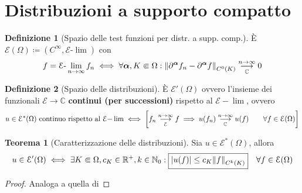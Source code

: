 \documentclass[a4paper,10pt]{article}
\theoremstyle{definition}
\newcommand{\bv}{\boldsymbol} %
\newcommand{\na}{\mathbb{N}} %
\newcommand{\re}{\mathbb{R}} %
\newcommand{\im}{\mathbb{C}} %
\newcommand{\llim}[2]{#2\text{-}\lim_{#1\to\infty}} %
\newcommand{\limm}[2]{\overunderset{#1\to\infty}{#2}{\longrightarrow}} %
\theoremstyle{indentdefinition}
\newtheorem{defn}{Definizione}[section]
\theoremstyle{indenttheorem}
\newtheorem{thm}{Teorema}
\theoremstyle{myremark}
\theoremstyle{indentgeneral}
\newenvironment{myboxed} 
{\noindent\begin{lrbox}{\mybox}\begin{minipage}{\textwidth}}
{\end{minipage}\end{lrbox}\fbox{\usebox{\mybox}}}
\begin{document}
\section{Distribuzioni a supporto compatto}

\begin{defn}[Spazio delle test funzioni per distr. a supp. comp.] È $\mathcal{E}(\Omega)\coloneqq(C^{\infty},\mathcal{E}\text{-}\lim)$ con $$f=\llim{n}{\mathcal{E}}f_n\iff \forall\bv{\alpha},K\Subset \Omega:\norm{\partial^{\bv{\alpha}}f_n-\partial^{\bv{\alpha}}f}_{C^0(K)}\limm{n}{\im}0$$
\end{defn}

\begin{defn}[Spazio delle distribuzioni] È $\mathcal{E}'(\Omega)$ ovvero l'insieme dei funzionali $\mathcal{E}\to\im$ \textbf{continui (per successioni)} rispetto al $\mathcal{E-}\lim$, ovvero
    $$u\in\mathcal{E}^*(\Omega) \text{ continuo rispetto al }\mathcal{E-}\lim\iff\left[ f_n\limm{n}{\mathcal{E}}f\implies u(f_n)\limm{n}{\im}u(f)\qquad\forall f\in\mathcal{E}(\Omega)\right] $$
    \end{defn}
\begin{myboxed}
        \begin{thm}[Caratterizzazione delle distribuzioni] Sia
            $u\in\mathcal{E}^*(\Omega)$, allora $$u\in\mathcal{E}'(\Omega) \iff \exists K\Subset \Omega, c_K\in\re^+,k\in\na_0:  \boxed{\abs{u(f)}\le c_K\norm{f}_{C^k(K)}}\quad \forall f\in\mathcal{E}(\Omega)$$
        \end{thm}
    \end{myboxed}
    \begin{proof}
        Analoga a quella di 
    \end{proof}
\end{document}
